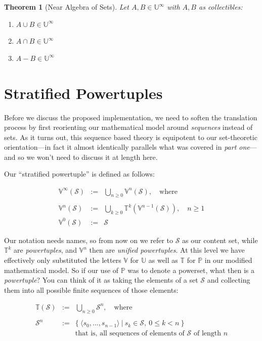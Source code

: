 \documentclass[twoside]{article}
\newcommand{\nthpt}[2][T]{\ensuremath{\mathbb{#1}^{#2}}}
\newcommand{\nthut}[2][V]{\ensuremath{\mathbb{#1}^{#2}}}
\newcommand{\ptunion}[2][T]{\ensuremath{\bigcup_{#2\ge 0}\mathbb{#1}^{#2}}}
\newcommand{\utunion}[2][V]{\ensuremath{\bigcup_{#2\ge 0}\mathbb{#1}^{#2}}}
\newcommand{\stratified}{\ensuremath{\mathbb{U}^\infty}}
\newcommand{\restratified}{\ensuremath{\mathbb{V}^\infty}}
\newcommand{\of}[1]{\ensuremath{(\mathcal{#1})}}
\newtheorem{theorem}{Theorem}
\newenvironment{definition}[1][Definition]{\begin{trivlist}
\item[\hskip \labelsep {\bfseries #1:}]}{\end{trivlist}}
\begin{document}
\begin{theorem}[Near Algebra of Sets]
Let $ A,B\in\stratified $ with $ A,B $ as collectibles:
\begin{enumerate}
\item $ A\cup B\in\stratified $
\item $ A\cap B\in\stratified $
\item $ A-B\in\stratified $
\end{enumerate}
\end{theorem}

\section*{Stratified Powertuples}

Before we discuss the proposed implementation, we need to soften the translation process by first reorienting our mathematical
model around \emph{sequences} instead of sets. As it turns out, this sequence based theory is equipotent to our set-theoretic
orientation---in fact it almost identically parallels what was covered in \emph{part one}---and so we won't need to discuss it
at length here.

Our ``stratified powertuple'' is defined as follows:

\begin{definition}[Stratified Powertuple]
$$ \begin{array}{rcl}
\restratified\of{S}	& :=	& \utunion{n}\of{S},\quad\mbox{where}		\\
										\\
\nthut{n}\of{S}		& :=	& \ptunion{k}(\nthut{n-1}\of{S}),\quad n\ge 1	\\
\nthut{0}\of{S}		& :=	& \mathcal{S}
\end{array} $$
\end{definition}
Our notation needs names, so from now on we refer to $ \mathcal{S} $ as our content set, while $ \nthpt{k} $ are \emph{powertuples},
and $ \nthut{n} $ then are \emph{unified powertuples}. At this level we have effectively only substituted the letters $ \mathbb{V} $
for $ \mathbb{U} $ as well as $ \mathbb{T} $ for $ \mathbb{P} $ in our modified mathematical model. So if our use of $ \mathbb{P} $
was to denote a powerset, what then is a \emph{powertuple}? You can think of it as taking the elements of a set $ \mathcal{S} $
and collecting them into all possible finite sequences of those elements:

$$ \begin{array}{rcl}
\mathbb{T}\of{S}	& :=	& \bigcup_{n\ge 0}\mathcal{S}^n,\quad\mbox{where}					\\
															\\
\mathcal{S}^n		& :=	& \{\ \langle s_0,\ldots,s_{n-1}\rangle\ |\ s_k\in\mathcal{S},\ 0\le k < n\ \}		\\
			&	& \mbox{that is, all sequences of elements of }\mathcal{S}\mbox{ of length } n
\end{array} $$
\end{document}
